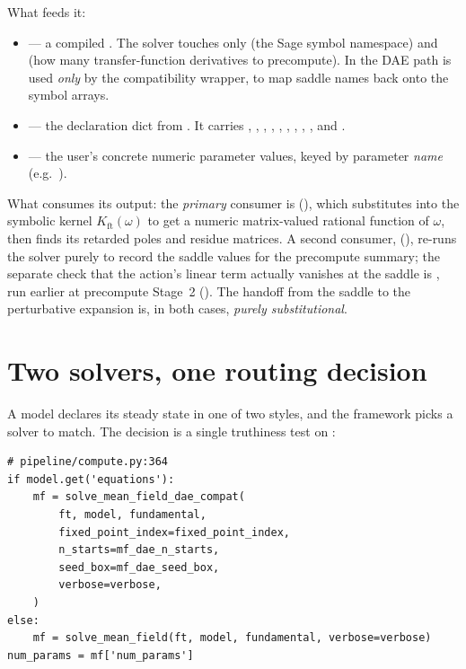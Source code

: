 What feeds it:
\begin{itemize}
  \item {} --- a compiled . The solver touches only
         (the Sage symbol namespace) and 
        (how many transfer-function derivatives to precompute). In the DAE path
         is used \emph{only} by the compatibility wrapper, to map saddle
        names back onto the  symbol arrays.
  \item {} --- the declaration dict from . It carries
        , , ,
        , , ,
        , , ,
        and .
  \item {} --- the user's concrete numeric parameter values, keyed
        by parameter \emph{name} (e.g.\ ).
\end{itemize}

What consumes its output: the \emph{primary} consumer is
(), which substitutes  into
the symbolic kernel $K_{\mathrm{ft}}(\omega)$ to get a numeric matrix-valued
rational function of $\omega$, then finds its retarded poles and residue
matrices. A second consumer, 
(), re-runs the solver purely to record the
saddle values for the precompute summary; the separate check that the action's
linear term actually vanishes at the saddle is , run earlier
at precompute Stage~2 (). The handoff from the saddle to the
perturbative expansion is, in both cases, \emph{purely substitutional}.

\section{Two solvers, one routing decision}

A model declares its steady state in one of two styles, and the framework picks a
solver to match. The decision is a single truthiness test on
:

\begin{lstlisting}
# pipeline/compute.py:364
if model.get('equations'):
    mf = solve_mean_field_dae_compat(
        ft, model, fundamental,
        fixed_point_index=fixed_point_index,
        n_starts=mf_dae_n_starts,
        seed_box=mf_dae_seed_box,
        verbose=verbose,
    )
else:
    mf = solve_mean_field(ft, model, fundamental, verbose=verbose)
num_params = mf['num_params']
\end{lstlisting}

